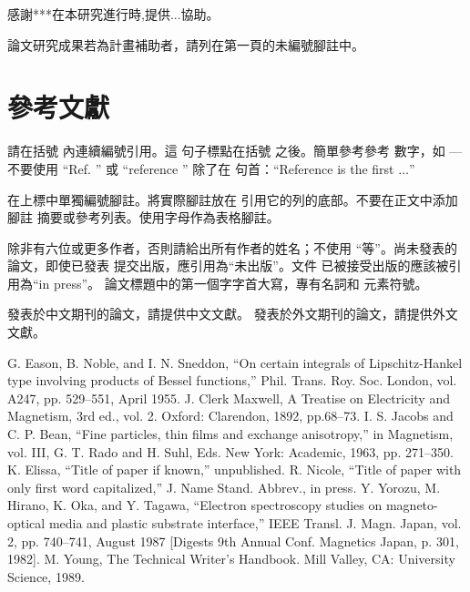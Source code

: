 \documentclass[conference]{IEEEtran}
\begin{document}
感謝***在本研究進行時,提供...協助。

論文研究成果若為計畫補助者，請列在第一頁的未編號腳註中。

\section*{參考文獻}

請在括號 \cite{b1} 內連續編號引用。這
句子標點在括號 \cite{b2} 之後。簡單參考參考
數字，如 \cite{b3} --- 不要使用 ``Ref. \cite{b3}'' 或 ``reference \cite{b3}'' 除了在
句首：``Reference \cite{b3} is the first $\ldots$''

在上標中單獨編號腳註。將實際腳註放在
引用它的列的底部。不要在正文中添加腳註
摘要或參考列表。使用字母作為表格腳註。

除非有六位或更多作者，否則請給出所有作者的姓名；不使用
``等''。尚未發表的論文，即使已發表
提交出版，應引用為“未出版”\cite{b4}。文件
已被接受出版的應該被引用為“in press”\cite{b5}。
論文標題中的第一個字字首大寫，專有名詞和
元素符號。

發表於中文期刊的論文，請提供中文文獻。
發表於外文期刊的論文，請提供外文文獻。



\begin{thebibliography}{00}
 G. Eason, B. Noble, and I. N. Sneddon, ``On certain integrals of Lipschitz-Hankel type involving products of Bessel functions,'' Phil. Trans. Roy. Soc. London, vol. A247, pp. 529--551, April 1955.
 J. Clerk Maxwell, A Treatise on Electricity and Magnetism, 3rd ed., vol. 2. Oxford: Clarendon, 1892, pp.68--73.
 I. S. Jacobs and C. P. Bean, ``Fine particles, thin films and exchange anisotropy,'' in Magnetism, vol. III, G. T. Rado and H. Suhl, Eds. New York: Academic, 1963, pp. 271--350.
 K. Elissa, ``Title of paper if known,'' unpublished.
 R. Nicole, ``Title of paper with only first word capitalized,'' J. Name Stand. Abbrev., in press.
 Y. Yorozu, M. Hirano, K. Oka, and Y. Tagawa, ``Electron spectroscopy studies on magneto-optical media and plastic substrate interface,'' IEEE Transl. J. Magn. Japan, vol. 2, pp. 740--741, August 1987 [Digests 9th Annual Conf. Magnetics Japan, p. 301, 1982].
 M. Young, The Technical Writer's Handbook. Mill Valley, CA: University Science, 1989.
\end{thebibliography}
\end{document}
